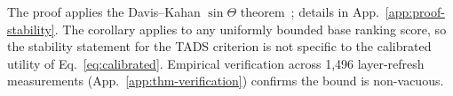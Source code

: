 The proof applies the Davis--Kahan $\sin\Theta$
theorem~\cite{daviskahan}; details in
App.~\ref{app:proof-stability}. The corollary applies to any
uniformly bounded base ranking score, so the stability statement
for the \textsc{TADS} criterion is not specific to the calibrated
utility of Eq.~\ref{eq:calibrated}. Empirical verification across
1{,}496 layer-refresh measurements (App.~\ref{app:thm-verification})
confirms the bound is non-vacuous.
